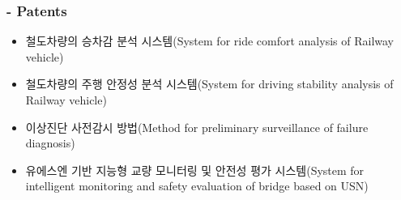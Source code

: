 \subsubsection{ - Patents}
\begin{itemize}
\item 철도차량의 승차감 분석 시스템(System for ride comfort analysis of Railway vehicle)
\item 철도차량의 주행 안정성 분석 시스템(System for driving stability analysis of Railway vehicle)
\item 이상진단 사전감시 방법(Method for preliminary surveillance of failure diagnosis)
\item 유에스엔 기반 지능형 교량 모니터링 및 안전성 평가 시스템(System for intelligent monitoring and safety evaluation of bridge based on USN)
\end{itemize}


